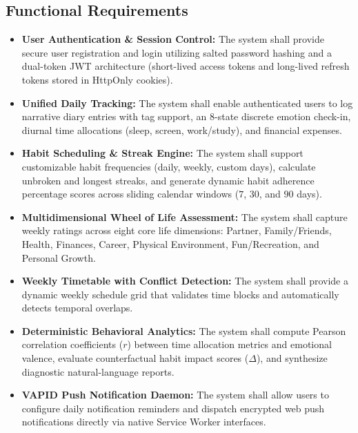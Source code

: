 \subsection{Functional Requirements}
\begin{itemize}
  \item \textbf{User Authentication \& Session Control:} The system shall provide secure user registration and login utilizing salted password hashing and a dual-token JWT architecture (short-lived access tokens and long-lived refresh tokens stored in HttpOnly cookies).
  \item \textbf{Unified Daily Tracking:} The system shall enable authenticated users to log narrative diary entries with tag support, an 8-state discrete emotion check-in, diurnal time allocations (sleep, screen, work/study), and financial expenses.
  \item \textbf{Habit Scheduling \& Streak Engine:} The system shall support customizable habit frequencies (daily, weekly, custom days), calculate unbroken and longest streaks, and generate dynamic habit adherence percentage scores across sliding calendar windows ($7$, $30$, and $90$ days).
  \item \textbf{Multidimensional Wheel of Life Assessment:} The system shall capture weekly ratings across eight core life dimensions: Partner, Family/Friends, Health, Finances, Career, Physical Environment, Fun/Recreation, and Personal Growth.
  \item \textbf{Weekly Timetable with Conflict Detection:} The system shall provide a dynamic weekly schedule grid that validates time blocks and automatically detects temporal overlaps.
  \item \textbf{Deterministic Behavioral Analytics:} The system shall compute Pearson correlation coefficients ($r$) between time allocation metrics and emotional valence, evaluate counterfactual habit impact scores ($\Delta$), and synthesize diagnostic natural-language reports.
  \item \textbf{VAPID Push Notification Daemon:} The system shall allow users to configure daily notification reminders and dispatch encrypted web push notifications directly via native Service Worker interfaces.
\end{itemize}

